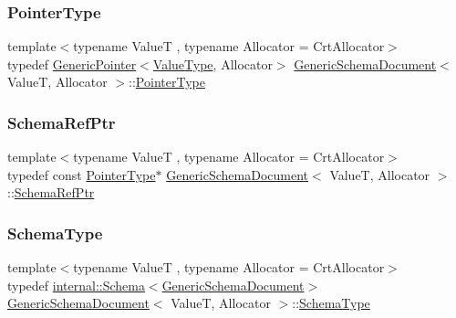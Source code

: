 \subsubsection{\texorpdfstring{Pointer\+Type}{PointerType}}
{\footnotesize\ttfamily template$<$typename ValueT , typename Allocator  = Crt\+Allocator$>$ \\
typedef \hyperlink{classGenericPointer}{Generic\+Pointer}$<$\hyperlink{classGenericSchemaDocument_ae246f1b6573a5a8a2c0d73d4eb64d53a}{Value\+Type}, Allocator$>$ \hyperlink{classGenericSchemaDocument}{Generic\+Schema\+Document}$<$ ValueT, Allocator $>$\+::\hyperlink{classGenericSchemaDocument_aeb62f562d4dc024402b00f97cbcef747}{Pointer\+Type}}

\mbox{\label{classGenericSchemaDocument_a2d829a5745e7d28aa3b1e33366b9861d}} 
\subsubsection{\texorpdfstring{Schema\+Ref\+Ptr}{SchemaRefPtr}}
{\footnotesize\ttfamily template$<$typename ValueT , typename Allocator  = Crt\+Allocator$>$ \\
typedef const \hyperlink{classGenericSchemaDocument_aeb62f562d4dc024402b00f97cbcef747}{Pointer\+Type}$\ast$ \hyperlink{classGenericSchemaDocument}{Generic\+Schema\+Document}$<$ ValueT, Allocator $>$\+::\hyperlink{classGenericSchemaDocument_a2d829a5745e7d28aa3b1e33366b9861d}{Schema\+Ref\+Ptr}\hspace{0.3cm}{\ttfamily [private]}}

\mbox{\label{classGenericSchemaDocument_acaf115202b159a2eb72c97c3dc6c3895}} 
\subsubsection{\texorpdfstring{Schema\+Type}{SchemaType}}
{\footnotesize\ttfamily template$<$typename ValueT , typename Allocator  = Crt\+Allocator$>$ \\
typedef \hyperlink{classinternal_1_1Schema}{internal\+::\+Schema}$<$\hyperlink{classGenericSchemaDocument}{Generic\+Schema\+Document}$>$ \hyperlink{classGenericSchemaDocument}{Generic\+Schema\+Document}$<$ ValueT, Allocator $>$\+::\hyperlink{classGenericSchemaDocument_acaf115202b159a2eb72c97c3dc6c3895}{Schema\+Type}}

